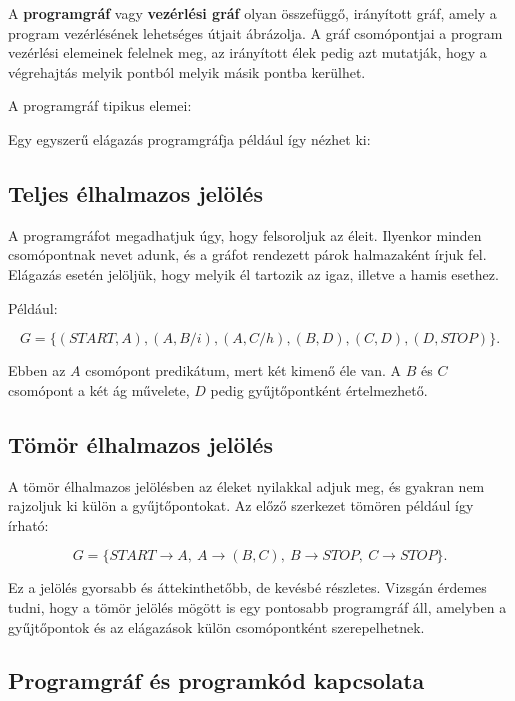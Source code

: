 A \textbf{programgráf} vagy \textbf{vezérlési gráf} olyan összefüggő, irányított gráf, amely a program vezérlésének lehetséges útjait ábrázolja. A gráf csomópontjai a program vezérlési elemeinek felelnek meg, az irányított élek pedig azt mutatják, hogy a végrehajtás melyik pontból melyik másik pontba kerülhet.

A programgráf tipikus elemei:

\begin{center}

\end{center}

Egy egyszerű elágazás programgráfja például így nézhet ki:



\subsection{Teljes élhalmazos jelölés}

A programgráfot megadhatjuk úgy, hogy felsoroljuk az éleit. Ilyenkor minden csomópontnak nevet adunk, és a gráfot rendezett párok halmazaként írjuk fel. Elágazás esetén jelöljük, hogy melyik él tartozik az igaz, illetve a hamis esethez.

Például:

\[
G=\{(START,A),(A,B/i),(A,C/h),(B,D),(C,D),(D,STOP)\}.
\]

Ebben az $A$ csomópont predikátum, mert két kimenő éle van. A $B$ és $C$ csomópont a két ág művelete, $D$ pedig gyűjtőpontként értelmezhető.

\subsection{Tömör élhalmazos jelölés}

A tömör élhalmazos jelölésben az éleket nyilakkal adjuk meg, és gyakran nem rajzoljuk ki külön a gyűjtőpontokat. Az előző szerkezet tömören például így írható:

\[
G=\{START\rightarrow A,\ A\rightarrow(B,C),\ B\rightarrow STOP,\ C\rightarrow STOP\}.
\]

Ez a jelölés gyorsabb és áttekinthetőbb, de kevésbé részletes. Vizsgán érdemes tudni, hogy a tömör jelölés mögött is egy pontosabb programgráf áll, amelyben a gyűjtőpontok és az elágazások külön csomópontként szerepelhetnek.

\subsection{Programgráf és programkód kapcsolata}

